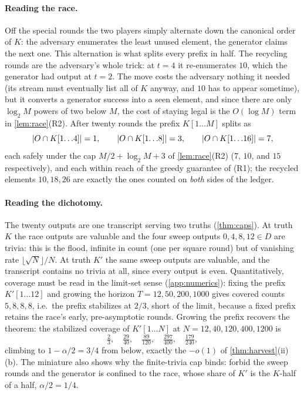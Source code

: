\documentclass[11pt]{article}
\numberwithin{equation}{section}
\DeclarePairedDelimiter{\abs}{\lvert}{\rvert}
\newcommand{\Out}{O}
\newcommand{\rest}[2]{#1[1\!\dots\! #2]}
\theoremstyle{plain}
\theoremstyle{definition}
\theoremstyle{remark}
\begin{document}
\paragraph{Reading the race.}
Off the special rounds the two players simply alternate down the canonical order of $K$:
the adversary enumerates the least unused element, the generator claims the next one. This
alternation is what splits every prefix in half. The recycling rounds are the adversary's
whole trick: at $t = 4$ it re-enumerates $10$, which the generator had output at $t = 2$.
The move costs the adversary nothing it needed (its stream must eventually list all of $K$
anyway, and $10$ has to appear sometime), but it converts a generator success into a seen
element, and since there are only $\log_2 M$ powers of two below $M$, the cost of staying
legal is the $O(\log M)$ term in \cref{lem:race}(R2). After twenty rounds the prefix
$\rest{K}{M}$ splits as
\[
  \abs{\Out \cap \rest{K}{4}} = 1, \qquad
  \abs{\Out \cap \rest{K}{8}} = 3, \qquad
  \abs{\Out \cap \rest{K}{16}} = 7,
\]
each safely under the cap $M/2 + \log_2 M + 3$ of \cref{lem:race}(R2) ($7$, $10$, and $15$
respectively), and each within reach of the greedy guarantee of (R1); the recycled elements
$10, 18, 26$ are exactly the ones counted on \emph{both} sides of the ledger.

\paragraph{Reading the dichotomy.}
The twenty outputs are one transcript serving two truths (\cref{thm:caps}). At truth $K$
the race outputs are valuable and the four sweep outputs $0, 4, 8, 12 \in D$ are trivia:
this is the flood, infinite in count (one per square round) but of vanishing rate
$\lfloor\sqrt N\rfloor / N$. At truth $K'$ the same sweep outputs are valuable, and the
transcript contains no trivia at all, since every output is even. Quantitatively, coverage
must be read in the limit-set sense (\cref{app:numerics}): fixing the prefix $\rest{K'}{12}$
and growing the horizon $T = 12, 50, 200, 1000$ gives covered counts $5, 8, 8, 8$, i.e.\
the prefix stabilizes at $2/3$, short of the limit, because a fixed prefix retains the
race's early, pre-asymptotic rounds. Growing the prefix recovers the theorem: the
stabilized coverage of $\rest{K'}{N}$ at $N = 12, 40, 120, 400, 1200$ is
\[
  \tfrac{2}{3},\quad
  \tfrac{29}{40},\quad
  \tfrac{89}{120},\quad
  \tfrac{297}{400},\quad
  \tfrac{179}{240},
\]
climbing to $1 - \alpha/2 = 3/4$ from below, exactly the $-o(1)$ of
\cref{thm:harvest}(ii)(b). The miniature also shows why the finite-trivia cap binds:
forbid the sweep rounds and the generator is confined to the race, whose share of $K'$ is
the $K$-half of a half, $\alpha/2 = 1/4$.
\end{document}
